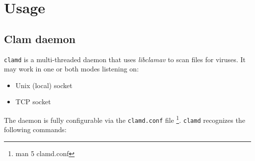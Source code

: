 \documentclass[a4paper,titlepage,12pt]{article}
\begin{document}
    \section{Usage}

    \subsection{Clam daemon}\label{clamd}
    \verb+clamd+ is a multi-threaded daemon that uses \emph{libclamav}
    to scan files for viruses. It may work in one or both modes listening on:
    \begin{itemize}
	\item Unix (local) socket
	\item TCP socket
    \end{itemize}
    The daemon is fully configurable via the \verb+clamd.conf+ file
    \footnote{man 5 clamd.conf}. \verb+clamd+ recognizes the following commands:
\end{document}
